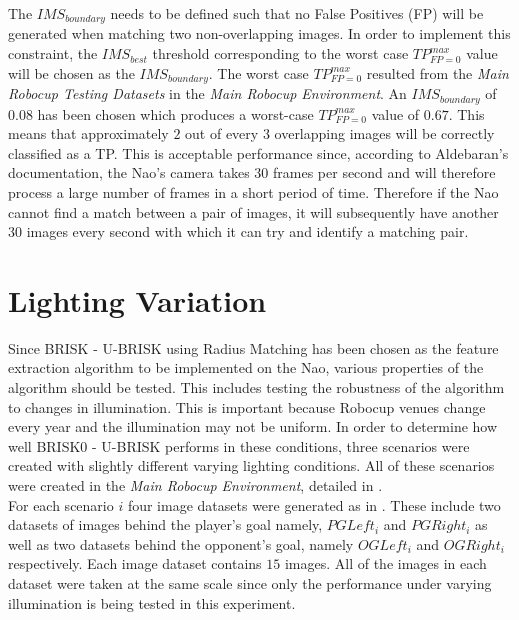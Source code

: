 \documentclass[11pt]{report}
\begin{document}
The $IMS_{boundary}$ needs to be defined such that no False Positives (FP) will be generated when matching two non-overlapping images. In order to implement this constraint, the $IMS_{best}$ threshold corresponding to the worst case $TP_{FP=0}^{max}$ value will be chosen as the $IMS_{boundary}$. The worst case $TP_{FP=0}^{max}$ resulted from the \textit{Main Robocup Testing Datasets} in the \textit{Main Robocup Environment}. An $IMS_{boundary}$ of $0.08$ has been chosen which produces a worst-case $TP_{FP=0}^{max}$ value of $0.67$. This means that approximately $2$ out of every $3$ overlapping images will be correctly classified as a TP. This is acceptable performance since, according to Aldebaran's documentation, the Nao's camera takes $30$ frames per second and will therefore process a large number of frames in a short period of time. Therefore if the Nao cannot find a match between a pair of images, it will subsequently have another $30$ images every second with which it can try and identify a matching pair.\\

\section{Lighting Variation}
\label{sec:lighting}
Since BRISK - U-BRISK using Radius Matching has been chosen as the feature extraction algorithm to be implemented on the Nao, various properties of the algorithm should be tested. This includes testing the robustness of the algorithm to changes in illumination. This is important because Robocup venues change every year and the illumination may not be uniform. In order to determine how well BRISK0 - U-BRISK performs in these conditions, three scenarios were created with slightly different varying lighting conditions. All of these scenarios were created in the \textit{Main Robocup Environment}, detailed in .\\ 

For each scenario $i$ four image datasets were generated as in . These include  two datasets of images behind the player's goal namely, \textit{$PG Left_{i}$} and \textit{$PG Right_i$} as well as two datasets behind the opponent's goal, namely \textit{$OG Left_i$} and \textit{$OG Right_i$} respectively. Each image dataset contains $15$ images. All of the images in each dataset were taken at the same scale since only the performance under varying illumination is being tested in this experiment.\\ 
\end{document}
